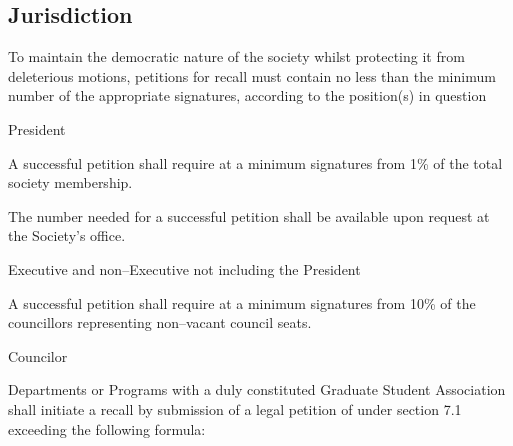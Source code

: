 \subsection{Jurisdiction}
To maintain the democratic nature of the society whilst protecting it from deleterious motions, petitions for recall must contain no less than the minimum number of the appropriate signatures, according to the position(s) in question

\begin{longenum}[ label*=\thesubsection.\arabic*., align=left]
	\item President
    \begin{longenum}[ label*=\arabic*., align=left]
		\item A successful petition shall require at a minimum signatures from 1\% of the total society membership.
    	\begin{longenum}[ label*=\arabic*., align=left]
			\item The number needed for a successful petition shall be available upon request at the Society's office.
		\end{longenum}
	\end{longenum}
   \item Executive and non--Executive not including the President
    \begin{longenum}[ label*=\arabic*., align=left]
		\item A successful petition shall require at a minimum signatures from 10\% of the councillors representing non--vacant council seats.
	\end{longenum}
	\item Councilor
    \begin{longenum}[ label*=\arabic*., align=left]
		\item Departments or Programs with a duly constituted Graduate Student Association shall initiate a recall by submission of a legal petition of under section 7.1 exceeding the following formula: \newline
        

\end{longenum}
\end{longenum}
